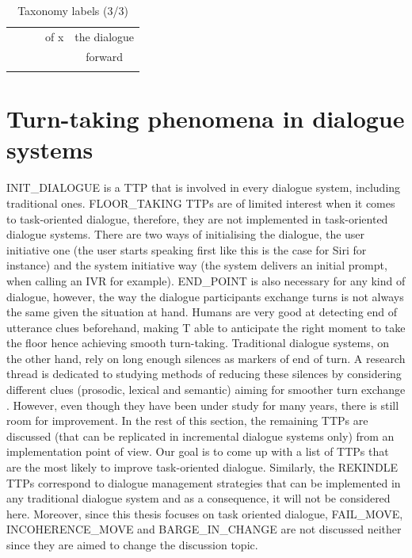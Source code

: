 \begin{table}[htp]
{\begin{tabular}{|c|c|c|c|c|}
                & & & of x & the dialogue \\
                & & & & forward \\
                & & & & \\
                \hline
       		\end{tabular}
       	}
        \caption{Taxonomy labels (3/3)}
        \label{tab:taxosynth3}
	\end{table}
		
	 \section{Turn-taking phenomena in dialogue systems}
	
				INIT\_DIALOGUE is a TTP that is involved in every dialogue system, including traditional ones. FLOOR\_TAKING TTPs are of limited interest when it comes to task-oriented dialogue, therefore, they are not implemented in task-oriented dialogue systems. There are two ways of initialising the dialogue, the user initiative one (the user starts speaking first like this is the case for Siri for instance) and the system initiative way (the system delivers an initial prompt, when calling an IVR for example). END\_POINT is also necessary for any kind of dialogue, however, the way the dialogue participants exchange turns is not always the same given the situation at hand. Humans are very good at detecting end of utterance clues beforehand, making T able to anticipate the right moment to take the floor hence achieving smooth turn-taking. Traditional dialogue systems, on the other hand, rely on long enough silences as markers of end of turn. A research thread is dedicated to studying methods of reducing these silences by considering different clues (prosodic, lexical and semantic) aiming for smoother turn exchange \cite{Raux2008,Gravano2011}. However, even though they have been under study for many years, there is still room for improvement. In the rest of this section, the remaining TTPs are discussed (that can be replicated in incremental dialogue systems only) from an implementation point of view. Our goal is to come up with a list of TTPs that are the most likely to improve task-oriented dialogue. Similarly, the REKINDLE TTPs correspond to dialogue management strategies that can be implemented in any traditional dialogue system and as a consequence, it will not be considered here. Moreover, since this thesis focuses on task oriented dialogue, FAIL\_MOVE, INCOHERENCE\_MOVE and BARGE\_IN\_CHANGE are not discussed neither since they are aimed to change the discussion topic.

